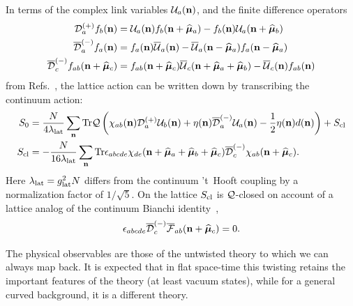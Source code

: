 In terms of the complex link variables $\mathcal U_a(\mathbf{n})$, and the finite difference operators
\begin{align}
  \mathcal D^{(+)}_a f_b(\mathbf{n}) & = \mathcal U_a(\mathbf{n})f_b(\mathbf{n} + \widehat{\boldsymbol{\mu}}_a) - f_b(\mathbf{n})\mathcal U_a(\mathbf{n}+ \widehat{\boldsymbol{\mu}}_b)                                       \cr
  {\overline{\cal D}}^{(-)}_a f_a(\mathbf{n}) & = f_a(\mathbf{n}){\overline{\cal U}}_a(\mathbf{n}) - {\overline{\cal U}}_a(\mathbf{n} - \widehat{\boldsymbol{\mu}}_a)f_a(\mathbf{n} - \widehat{\boldsymbol{\mu}}_a)                                   \\
  {\overline{\cal D}}_c^{(-)} f_{ab}(\mathbf{n} + \widehat{\boldsymbol{\mu}}_c) & = f_{ab}(\mathbf{n} + \widehat{\boldsymbol{\mu}}_c) {\overline{\cal U}}_c(\mathbf{n} + \widehat{\boldsymbol{\mu}}_a + \widehat{\boldsymbol{\mu}}_b) - {\overline{\cal U}}_c(\mathbf{n})f_{ab}(\mathbf{n}) \nonumber
\end{align}
from Refs.~\cite{Catterall:2007kn, Damgaard:2008pa}, the lattice action can be written down by transcribing the continuum action:
\begin{align}
  \label{SlatQ}
  S_0 & = \frac{N}{4\lambda_{\rm lat}} \sum_{\mathbf{n}} \mathrm{Tr}  \mathcal{Q} \left(\chi_{ab}(\mathbf{n})\mathcal D_a^{(+)}\mathcal U_b(\mathbf{n}) + \eta(\mathbf{n}) {\overline{\cal D}}_a^{(-)}\mathcal U_a(\mathbf{n}) - \frac{1}{2}\eta(\mathbf{n}) d(\mathbf{n}) \right) + S_{\rm cl} \\
  S_{\rm cl} & = -\frac{N}{16\lambda_{\rm lat}} \sum_{\mathbf{n}} \mathrm{Tr} \epsilon_{abcde} \chi_{de}(\mathbf{n} + \widehat{\boldsymbol{\mu}}_a + \widehat{\boldsymbol{\mu}}_b + \widehat{\boldsymbol{\mu}}_c) {\overline{\cal D}}^{(-)}_{c} \chi_{ab}(\mathbf{n} + \widehat{\boldsymbol{\mu}}_c).
\end{align}
Here $\lambda_{\rm lat} = g_{\rm lat}^2 N$ differs from the continuum 't~Hooft coupling by a 
normalization factor of $1 / \sqrt{5}$. 
On the lattice $S_{\rm cl}$ is $\mathcal Q$-closed on account of a lattice analog of the continuum 
Bianchi identity~\cite{Catterall:2007kn},
\begin{equation}
  \epsilon_{abcde} {\overline{\cal D}}^{(-)}_c {\overline{\cal F}}_{ab}(\mathbf{n} + \widehat{\boldsymbol{\mu}}_c) = 0.
\end{equation}

The physical observables are those of the untwisted theory to which we can always map back.
It is expected that in flat space-time this twisting retains the important features 
of the theory (at least vacuum states), 
while for a general curved background, it is a different theory. 

